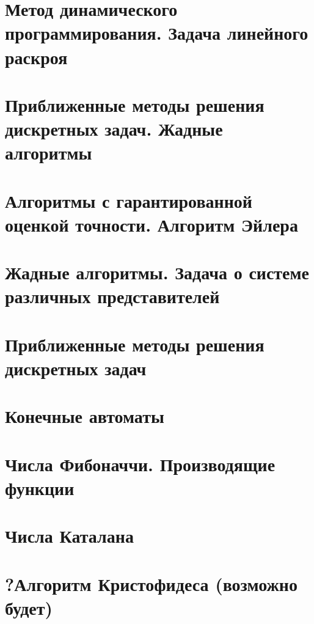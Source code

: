 \documentclass[12pt, fleqn]{article}
\begin{document}
\section{Метод динамического программирования. Задача линейного раскроя}


\section{Приближенные методы решения дискретных задач. Жадные алгоритмы}


\section{Алгоритмы с гарантированной оценкой точности. Алгоритм Эйлера}


\section{Жадные алгоритмы. Задача о системе различных представителей}


\section{Приближенные методы решения дискретных задач}


\section{Конечные автоматы}


\section{Числа Фибоначчи. Производящие функции}


\section{Числа Каталана}


\section{?Алгоритм Кристофидеса (возможно будет)}
\end{document}

